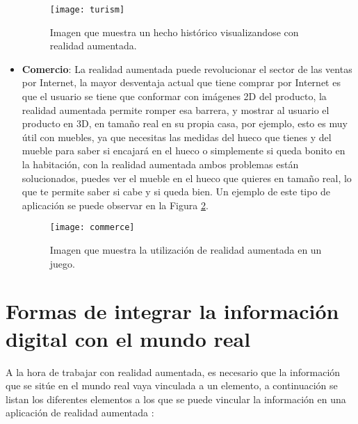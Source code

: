 \begin{itemize}
  \begin{figure}[h]
    \centering
    \texttt{[image: turism]}
    \caption{Imagen que muestra un hecho histórico visualizandose con realidad aumentada. \cite{layar}}
    \label{figura-turismo}
  \end{figure}

  \item \textbf{Comercio}: La realidad aumentada puede revolucionar el sector de las ventas por Internet, la mayor desventaja actual que tiene comprar por Internet es que el usuario se tiene que conformar con imágenes 2D del producto, la realidad aumentada permite romper esa barrera, y mostrar al usuario el producto en 3D, en tamaño real en su propia casa, por ejemplo, esto es muy útil con muebles, ya que necesitas las medidas del hueco que tienes y del mueble para saber si encajará en el hueco o simplemente si queda bonito en la habitación, con la realidad aumentada ambos problemas están solucionados, puedes ver el mueble en el hueco que quieres en tamaño real, lo que te permite saber si cabe y si queda bien. Un ejemplo de este tipo de aplicación se puede observar en la Figura \ref{figura-comercio}.

  \begin{figure}[h]
    \centering
    \texttt{[image: commerce]}
    \caption{Imagen que muestra la utilización de realidad aumentada en un juego.\protect\footnotemark}
    \label{figura-comercio}
  \end{figure}


\end{itemize}

\newpage

\section{Formas de integrar la información digital con el mundo real}
A la hora de trabajar con realidad aumentada, es necesario que la información que se sitúe en el mundo real vaya vinculada a un elemento, a continuación se listan los diferentes elementos a los que se puede vincular la información en una aplicación de realidad aumentada \cite{prendes-espinosa}:


